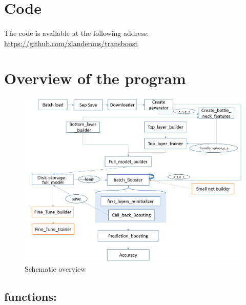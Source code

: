 \documentclass[11 pt]{article}
\begin{document}
\bigskip
\nocite{*}



\pagebreak
\begin{appendices}

  \section{Code}
  \paragraph{} The code is available at the following address:\\
  \url{https://github.com/zlanderous/transboost}

  \section{Overview of the program}
  \begin{figure}[h]
    \includegraphics[width=\textwidth]{schema.png}
    \caption{Schematic overview}
    \label{figTot}
  \end{figure}
  
  \subsection*{functions:}


\end{appendices}
\end{document}

